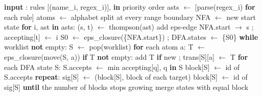 \documentclass[journal,a4paper]{IEEEtran}
\begin{document}
\begin{algorithm}[!tb]
\scriptsize
\caption{Regex to minimized DFA}\label{alg:2}
\begin{algorithmic}[1]
\State \hspace*{1.0em}\textbf{input} : rules [(name\_i, regex\_i)], \textbf{in} priority order
\State \hspace*{1.0em}asts  $\leftarrow$ [parse(regex\_i) \textbf{for} each rule]
\State \hspace*{1.0em}atoms $\leftarrow$ alphabet split at every range boundary
\State \hspace*{1.0em}NFA   $\leftarrow$ new start state
\State \hspace*{1.0em}\textbf{for} i, ast \textbf{in} asts:
\State \hspace*{2.0em}(s, t) $\leftarrow$ thompson(ast)
\State \hspace*{2.0em}add eps-edge NFA.start $\rightarrow$ s ; accepting[t] $\leftarrow$ i
\State \hspace*{1.0em}S0 $\leftarrow$ eps\_closure(\{NFA.start\}) ; DFA.states $\leftarrow$ \{S0\}
\State \hspace*{1.0em}\textbf{while} worklist \textbf{not} empty:
\State \hspace*{2.0em}S $\leftarrow$ pop(worklist)
\State \hspace*{2.0em}\textbf{for} each atom a:
\State \hspace*{3.0em}T $\leftarrow$ eps\_closure(move(S, a))
\State \hspace*{3.0em}\textbf{if} T \textbf{not} empty: add T \textbf{if} new ; trans[S][a] $\leftarrow$ T
\State \hspace*{1.0em}\textbf{for} each DFA state S:
\State \hspace*{2.0em}S.accepts $\leftarrow$ min accepting[q], q \textbf{in} S
\Statex {}
\State \hspace*{1.0em}block[S] $\leftarrow$ id of S.accepts
\State \hspace*{1.0em}\textbf{repeat}:
\State \hspace*{2.0em}sig[S] $\leftarrow$ (block[S], block of each target)
\State \hspace*{2.0em}block[S] $\leftarrow$ id of sig[S]
\State \hspace*{1.0em}\textbf{until} the number of blocks stops growing
\State \hspace*{1.0em}merge states with equal block
\end{algorithmic}
\end{algorithm}
\end{document}
